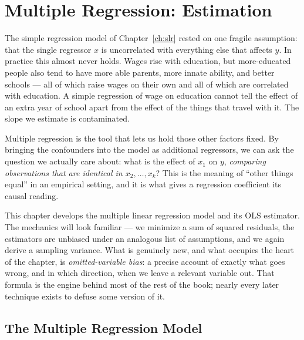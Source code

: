 \chapter{Multiple Regression: Estimation}
\label{ch:mlr}

The simple regression model of Chapter~\ref{ch:slr} rested on one fragile assumption: that the single regressor $x$ is uncorrelated with everything else that affects $y$. In practice this almost never holds. Wages rise with education, but more-educated people also tend to have more able parents, more innate ability, and better schools --- all of which raise wages on their own and all of which are correlated with education. A simple regression of wage on education cannot tell the effect of an extra year of school apart from the effect of the things that travel with it. The slope we estimate is contaminated.

Multiple regression is the tool that lets us hold those other factors fixed. By bringing the confounders into the model as additional regressors, we can ask the question we actually care about: what is the effect of $x_1$ on $y$, \emph{comparing observations that are identical in $x_2,\dots,x_k$}? This is the meaning of ``other things equal'' in an empirical setting, and it is what gives a regression coefficient its causal reading.

This chapter develops the multiple linear regression model and its OLS estimator. The mechanics will look familiar --- we minimize a sum of squared residuals, the estimators are unbiased under an analogous list of assumptions, and we again derive a sampling variance. What is genuinely new, and what occupies the heart of the chapter, is \emph{omitted-variable bias}: a precise account of exactly what goes wrong, and in which direction, when we leave a relevant variable out. That formula is the engine behind most of the rest of the book; nearly every later technique exists to defuse some version of it.

\section{The Multiple Regression Model}


